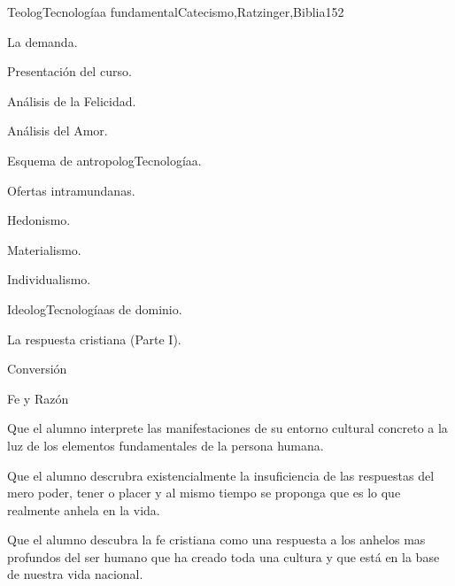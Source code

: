 \begin{syllabus}
\begin{unit}{TeologTecnologíaa fundamental}{Catecismo,Ratzinger,Biblia}{15}{2}
\begin{topics}
	\item La demanda. 
	      \begin{inparaenum}
		    \item Presentación del curso.
		    \item Análisis de la Felicidad.
		    \item Análisis del Amor.
		    \item Esquema de antropologTecnologíaa.
	      \end{inparaenum}
	\item Ofertas intramundanas. 
	      \begin{inparaenum}
		    \item Hedonismo.
		    \item Materialismo.
		    \item Individualismo.
		    \item IdeologTecnologíaas de dominio.
	      \end{inparaenum}
	\item La respuesta cristiana (Parte I). 
	      \begin{inparaenum}
		    \item Conversión
		    \item Fe y Razón
	      \end{inparaenum}
\end{topics}
\begin{unitgoals}
	\item Que el alumno interprete las manifestaciones de su entorno cultural concreto a la luz de los elementos fundamentales de la persona humana.
	\item Que el alumno descrubra existencialmente la insuficiencia de las respuestas del mero poder, tener o placer y al mismo tiempo se proponga que es lo que realmente anhela en la vida.
	\item Que el alumno descubra la fe cristiana como una respuesta a los anhelos mas profundos del ser humano que ha creado toda una cultura y que está en la base de nuestra vida nacional.
\end{unitgoals}
\end{unit}


\end{syllabus}
